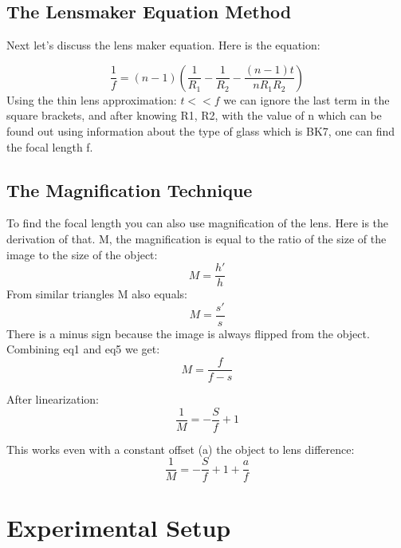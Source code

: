 \documentclass{article}
\begin{document}
\subsection{The Lensmaker Equation Method}
Next let’s discuss the lens maker equation. Here is the equation:



\begin{equation}
\frac{1}{f} = (n-1) \left( \frac{1}{R_1} - \frac{1}{R_2} - \frac{(n-1)t}{n R_1 R_2} \right)
\end{equation}
Using the thin lens approximation: $t << f$ we can ignore the last term in the square brackets, and after knowing R1, R2, with the value of n which can be found out using information about the type of glass which is BK7, one can find the focal length f.

\subsection{The Magnification Technique}
To find the focal length you can also use magnification of the lens. Here is the derivation of that. M, the magnification is equal to the ratio of the size of the image to the size of the object:
\begin{equation}
M = \frac{h'}{h}
\end{equation}
From similar triangles M also equals:
\begin{equation}
M = \frac{s'}{s}
\end{equation}
There is a minus sign because the image is always flipped from the object. Combining eq1 and eq5 we get:
\begin{equation}
M = \frac{f}{f-s}
\end{equation}

After linearization:
\begin{equation}
\frac{1}{M} = -\frac{S}{f} + 1
\end{equation}

This works even with a constant offset (a) the object to lens difference:
\begin{equation}
\frac{1}{M} = -\frac{S}{f} + 1 + \frac{a}{f}
\end{equation}




\section{Experimental Setup}
\end{document}
